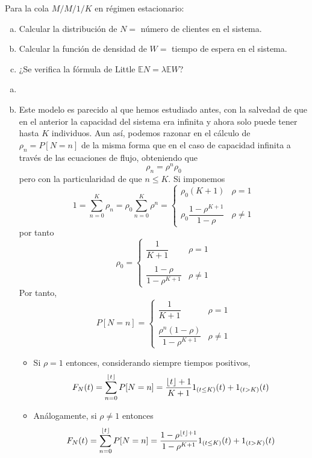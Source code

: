 \documentclass[twoside]{article}
\DeclarePairedDelimiter\floor{\lfloor}{\rfloor}
\begin{document}
\begin{ejercicio}{2} 
Para la cola $M/M/1/K$ en régimen estacionario: 
\begin{enumerate}[(a)]
	\item Calcular la distribución de $N=$ número de clientes en el sistema.
	\item Calcular la función de densidad de $W=$ tiempo de espera en el sistema.
	\item ¿Se verifica la fórmula de Little $\mathbb{E}N= \lambda \mathbb{E}W$?
\end{enumerate}
\end{ejercicio}
\begin{solucion}
\begin{enumerate}[(a)]
\item[]
\item Este modelo es parecido al que hemos estudiado antes, con la salvedad de que en el anterior la capacidad del sistema era infinita y ahora solo puede tener hasta $K$ individuos. Aun así, podemos razonar en el cálculo de $\rho_n = P[N=n]$ de la misma forma que en el caso de capacidad infinita a través de las ecuaciones de flujo, obteniendo que
$$
\rho_n  = \rho^n \rho_0
$$
pero con la particularidad de que $n\leq K$. Si imponemos
$$
1 = \sum_{n=0}^K \rho_n  = \rho_0 \sum_{n=0}^K \rho^n = \begin{cases}
\rho_0 (K+1) & \rho= 1\\ \\
\rho_0 \dfrac{1-\rho^{K+1}}{1-\rho}& \rho\neq 1
\end{cases}
$$
por tanto
$$
\rho_0  = \begin{cases}
\dfrac{1}{K+1} & \rho = 1 \\ \\
\dfrac{1-\rho}{1-\rho^{K+1}} & \rho \neq 1
\end{cases}
$$
Por tanto, 
$$
P[N=n] = \begin{cases}
\dfrac{1}{K+1} & \rho = 1 \\ \\
\dfrac{\rho^n(1-\rho)}{1-\rho^{K+1}} & \rho \neq 1
\end{cases}
$$
\begin{itemize}
\item Si $\rho=1$ entonces, considerando siempre tiempos positivos, 
$$
F_N(t) = \sum_{n=0}^{\floor{t}} P[N=n] = \frac{\floor{t}+1}{K+1}1_{(t\leq K)}(t) + 1_{(t>K)}(t)
$$
\item Análogamente, si $\rho\neq 1$ entonces
$$
F_N(t) = \sum_{n=0}^{\floor{t}} P[N=n] = \frac{1-\rho^{\floor{t}+1}}{1-\rho^{K+1}}1_{(t\leq K)}(t) + 1_{(t>K)}(t) 
$$
\end{itemize}
\end{enumerate}
\end{solucion}
\end{document}
